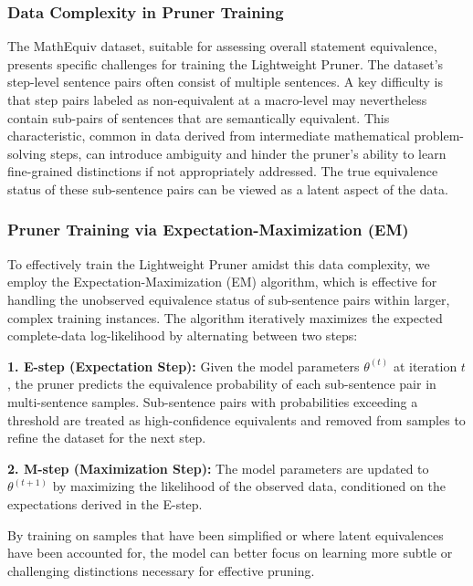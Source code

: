 \documentclass[11pt]{article}
\begin{document}
\subsubsection{Data Complexity in Pruner Training}
The MathEquiv dataset, suitable for assessing overall statement equivalence, presents specific challenges for training the Lightweight Pruner. The dataset's step-level sentence pairs often consist of multiple sentences. A key difficulty is that step pairs labeled as non-equivalent at a macro-level may nevertheless contain sub-pairs of sentences that are semantically equivalent. This characteristic, common in data derived from intermediate mathematical problem-solving steps, can introduce ambiguity and hinder the pruner's ability to learn fine-grained distinctions if not appropriately addressed. The true equivalence status of these sub-sentence pairs can be viewed as a latent aspect of the data.

\subsubsection{Pruner Training via Expectation-Maximization (EM)}
To effectively train the Lightweight Pruner amidst this data complexity, we employ the Expectation-Maximization (EM) algorithm, which is effective for handling the unobserved equivalence status of sub-sentence pairs within larger, complex training instances. 
The algorithm iteratively maximizes the expected complete-data log-likelihood by alternating between two steps:

\textbf{1. E-step (Expectation Step):}
Given the model parameters $\theta^{(t)}$ at iteration $t$, the pruner predicts the equivalence probability of each sub-sentence pair in multi-sentence samples. Sub-sentence pairs with probabilities exceeding a threshold are treated as high-confidence equivalents and removed from samples to refine the dataset for the next step.

\textbf{2. M-step (Maximization Step):}
The model parameters are updated to $\theta^{(t+1)}$ by maximizing the likelihood of the observed data, conditioned on the expectations derived in the E-step.

By training on samples that have been simplified or where latent equivalences have been accounted for, the model can better focus on learning more subtle or challenging distinctions necessary for effective pruning.
\end{document}
